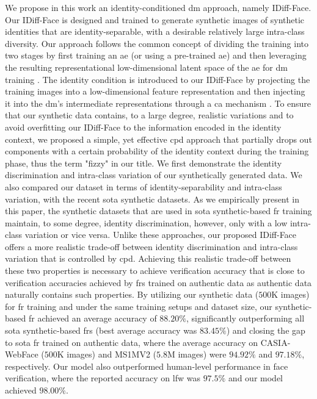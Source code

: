 \documentclass[10pt,twocolumn,letterpaper]{article}
\newcommand{\approachname}{IDiff-Face }
\newcommand{\approachnamewithoutspace}{IDiff-Face}
\begin{document}
We propose in this work an identity-conditioned \acrlong{dm} approach, namely \approachnamewithoutspace. Our \approachname is designed and trained to generate synthetic images of synthetic identities that are identity-separable, with a desirable relatively large intra-class diversity.
Our approach follows the common concept \cite{Rombach2021} of dividing the training into two stages by first training an \acrshort{ae} (or using a pre-trained \acrshort{ae}) and then leveraging the resulting representational low-dimensional latent space of the \acrshort{ae} for \acrshort{dm} training \cite{Rombach2021}.  The identity condition is introduced to our \approachname by projecting the training images into a low-dimensional feature representation and then injecting it into the \acrshort{dm}'s intermediate representations through a \acrfull{ca} mechanism \cite{Rombach2021}. To ensure that our synthetic data contains, to a large degree, realistic variations and to avoid overfitting our \approachname to the information encoded in the identity context, we proposed a simple, yet effective \acrfull{cpd} approach that partially drops out components with a certain probability of the identity context during the training phase, thus the term "fizzy" in our title. 
We first demonstrate the identity discrimination and intra-class variation of our synthetically generated data. We also compared our dataset in terms of identity-separability and intra-class variation, with the recent \acrshort{sota} synthetic datasets. As we empirically present in this paper, the synthetic datasets that are used in \acrshort{sota} synthetic-based \acrshort{fr} training maintain, to some degree, identity discrimination, however, only with a low intra-class variation or vice versa. 
Unlike these approaches, our proposed \approachname offers a more realistic trade-off between identity discrimination and intra-class variation that is controlled by \acrshort{cpd}.
Achieving this realistic trade-off between these two properties is necessary to achieve verification accuracy that is close to verification accuracies achieved by \acrshort{fr}s trained on authentic data as authentic data naturally contains such properties. By utilizing our synthetic data ($500$K images) for \acrshort{fr} training and under the same training setups and dataset size, our synthetic-based \acrshort{fr} achieved an average accuracy of $88.20\%$, significantly outperforming 
all \acrshort{sota} synthetic-based \acrshort{fr}s (best average accuracy was $83.45\%$) and closing the gap to \acrshort{sota} \acrshort{fr} trained on authentic data, where the average accuracy on CASIA-WebFace \cite{Yi2014} ($500$K images) and MS1MV2 \cite{MSCeleb1MDataset,ArcFace} ($5.8$M images) were $94.92\%$ and $97.18\%$, respectively.
Our model also outperformed human-level performance in face verification, where the reported accuracy on \acrfull{lfw} \cite{LFWDatabase} was $97.5\%$ \cite{DBLP:conf/iccv/KumarBBN09} and our model achieved $98.00\%$.
\end{document}
